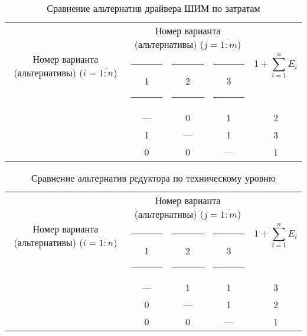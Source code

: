 \begin{table}[ht!]
    \centering
    \begin{tabular}{|c|c|c|c|c|}
        \hline
        \multirow{2}{2.4cm}[-0.5pc]{
            \centering
            Номер варианта (альтернативы) ($i = \overline{1:n}$)
        } &
        \multicolumn{3}{c|}{
            \parbox[t]{2.4cm}{
                \centering
                Номер варианта (альтернативы) ($j = \overline{1:m}$)
            }
        } &
        \multirow{2}{1.7cm}{
            \centering
            $$1 + \sum_{i=1}^n E_i$$
        } \\
        &
        \centering \rule{2pt}{0pt} 1 \rule{2pt}{0pt} &
        \centering \rule{2pt}{0pt} 2 \rule{2pt}{0pt} &
        \centering \rule{2pt}{0pt} 3 \rule{2pt}{0pt} & \\
        \hline \hline
        \centering{1} &---& 0 & 1 & 2 \\ \hline
        \centering{2} & 1 &---& 1 & 3 \\ \hline
        \centering{3} & 0 & 0 &---& 1 \\ \hline
    \end{tabular}
    \caption{Сравнение альтернатив драйвера ШИМ по затратам}
    \label{tbl_drv_cost_lvl_comparison}
\end{table}

\begin{table}[ht!]
    \centering
    \begin{tabular}{|c|c|c|c|c|}
        \hline
        \multirow{2}{2.4cm}[-0.5pc]{
            \centering
            Номер варианта (альтернативы) ($i = \overline{1:n}$)
        } &
        \multicolumn{3}{c|}{
            \parbox[t]{2.4cm}{
                \centering
                Номер варианта (альтернативы) ($j = \overline{1:m}$)
            }
        } &
        \multirow{2}{1.7cm}{
            \centering
            $$1 + \sum_{i=1}^n E_i$$
        } \\
        &
        \centering \rule{2pt}{0pt} 1 \rule{2pt}{0pt} &
        \centering \rule{2pt}{0pt} 2 \rule{2pt}{0pt} &
        \centering \rule{2pt}{0pt} 3 \rule{2pt}{0pt} & \\
        \hline \hline
        \centering{1} &---& 1 & 1 & 3 \\ \hline
        \centering{2} & 0 &---& 1 & 2 \\ \hline
        \centering{3} & 0 & 0 &---& 1 \\ \hline
    \end{tabular}
    \caption{Сравнение альтернатив редуктора по техническому уровню}
    \label{tbl_red_tech_lvl_comparison}
\end{table}

